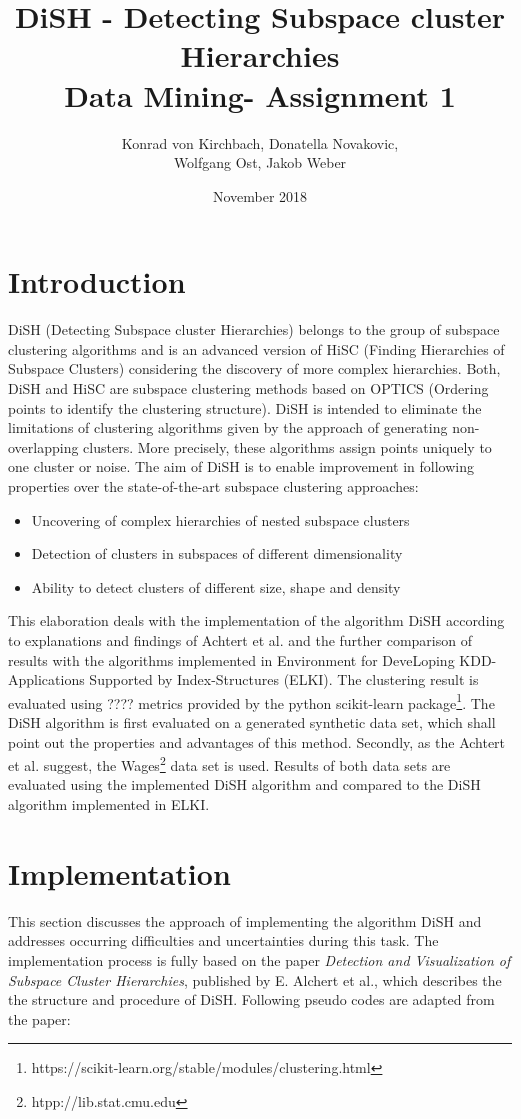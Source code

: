 \documentclass{article}
\title{DiSH - Detecting Subspace cluster Hierarchies \\ Data Mining- Assignment 1}
\author{Konrad von Kirchbach, Donatella Novakovic, \\ Wolfgang Ost, Jakob Weber}
\date{November 2018}
\begin{document}
\maketitle

\section{Introduction}
DiSH (Detecting Subspace cluster Hierarchies) belongs to the group of subspace clustering algorithms and is an advanced version of HiSC (Finding Hierarchies of Subspace Clusters) considering the discovery of more complex hierarchies. Both, DiSH and HiSC are subspace clustering methods based on OPTICS (Ordering points to identify the clustering structure). DiSH is intended to eliminate the limitations of clustering algorithms given by the approach of generating non-overlapping clusters. More precisely, these algorithms assign points uniquely to one cluster or noise. The aim of DiSH is to enable improvement in following properties over the state-of-the-art subspace clustering approaches: 
\begin{itemize}
    \item Uncovering of complex hierarchies of nested subspace clusters
    \item Detection of clusters in subspaces of different dimensionality
    \item Ability to detect clusters of different size, shape and density
\end{itemize}

This elaboration deals with the implementation of the algorithm DiSH according to explanations and findings of Achtert et al. and the further comparison of results with the algorithms implemented in Environment for DeveLoping KDD-Applications Supported by Index-Structures (ELKI). The clustering result is evaluated using ???? metrics provided by the python scikit-learn package\footnote{https://scikit-learn.org/stable/modules/clustering.html}. The DiSH algorithm is first evaluated on a generated synthetic data set, which shall point out the properties and advantages of this method. Secondly, as the Achtert et al. suggest, the Wages\footnote{htpp://lib.stat.cmu.edu} data set is used. Results of both data sets are evaluated using the implemented DiSH algorithm and compared to the DiSH algorithm implemented in ELKI.    

\section{Implementation}
This section discusses the approach of implementing the algorithm DiSH and addresses occurring difficulties and uncertainties during this task. The implementation process is fully based on the paper \emph{Detection and Visualization of Subspace Cluster Hierarchies}, published by E. Alchert et al., which describes the the structure and procedure of DiSH. Following pseudo codes are adapted from the paper:\par
\end{document}
